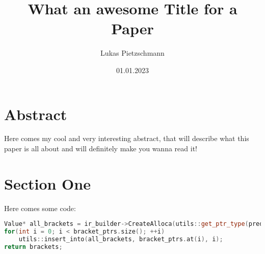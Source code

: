 \documentclass[english]{article}
\title{What an awesome Title for a Paper}
\author{Lukas Pietzschmann}
\date{01.01.2023}
\begin{document}
\maketitle

\newpage

\thispagestyle{plain}
\setcounter{page}{1}
\tableofcontents
\newpage
\listoffigures
\lstlistoflistings

\newpage

\thispagestyle{empty}
\section*{Abstract}
Here comes my cool and very interesting abstract, that will describe what this paper is all about
and will definitely make you wanna read it!

\emptypage

\thispagestyle{plain}
\setcounter{page}{1}

\section{Section One}

\par
Here comes some code:

\begin{lstlisting}[language=c++, caption=Ooof what a nice peace of code]
Value* all_brackets = ir_builder->CreateAlloca(utils::get_ptr_type(predef_structures::bracket()), utils::get_integer_constant(bracket_ptrs.size()));
for(int i = 0; i < bracket_ptrs.size(); ++i)
	utils::insert_into(all_brackets, bracket_ptrs.at(i), i);
return brackets;
\end{lstlisting}
\end{document}
